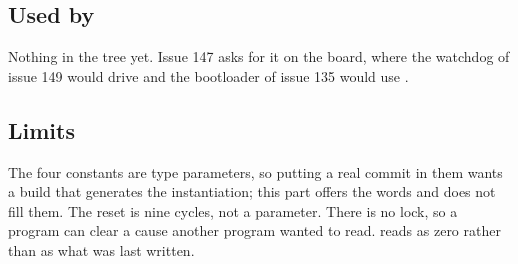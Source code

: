 \subsection*{Used by}

Nothing in the tree yet. Issue 147 asks for it on the board, where the
watchdog of issue 149 would drive  and the bootloader of
issue 135 would use .

\subsection*{Limits}

The four constants are type parameters, so putting a real commit in
them wants a build that generates the instantiation; this part offers
the words and does not fill them. The reset is nine cycles, not a
parameter. There is no lock, so a program can clear a cause another
program wanted to read.  reads as zero rather than as what
was last written.
